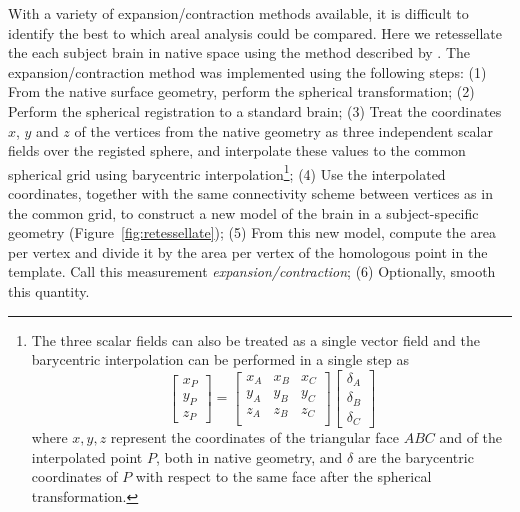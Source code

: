 With a variety of expansion/contraction methods available, it is difficult to identify the best to which areal analysis could be compared. Here we retessellate the each subject brain in native space using the method described by \citet{Saad2004}. The expansion/contraction method was implemented using the following steps: (1) From the native surface geometry, perform the spherical transformation; (2) Perform the spherical registration to a standard brain; (3) Treat the coordinates $x$, $y$ and $z$ of the vertices from the native geometry as three independent scalar fields over the registed sphere, and interpolate these values to the common spherical grid using barycentric interpolation\footnote{The three scalar fields can also be treated as a single vector field and the barycentric interpolation can be performed in a single step as
\begin{displaymath}
\left[
\begin{array}{c}
x_{P} \\
y_{P} \\
z_{P}
\end{array} \right] = \left[
\begin{array}{ccc}
x_{A} & x_{B} & x_{C} \\
y_{A} & y_{B} & y_{C} \\
z_{A} & z_{B} & z_{C} \\
\end{array}
\right] \left[
\begin{array}{c}
\delta_{A} \\
\delta_{B} \\
\delta_{C}
\end{array} \right]
\end{displaymath} where $x,y,z$ represent the coordinates of the triangular face $ABC$ and of the interpolated point $P$, both in native geometry, and $\delta$ are the barycentric coordinates of $P$ with respect to the same face after the spherical transformation.}; (4) Use the interpolated coordinates, together with the same connectivity scheme between vertices as in the common grid, to construct a new model of the brain in a subject-specific geometry (Figure~\ref{fig:retessellate}); (5) From this new model, compute the area per vertex and divide it by the area per vertex of the homologous point in the template. Call this measurement \emph{expansion/contraction}; (6) Optionally, smooth this quantity.

